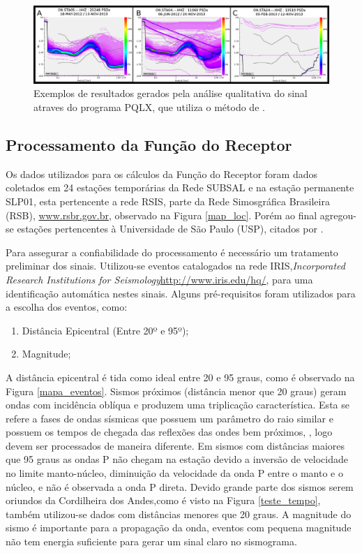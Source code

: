 \begin{figure}[!ht]
\centering
\includegraphics[scale=0.35]{Figs/pqlx_results.png}
\caption{Exemplos de resultados gerados pela análise qualitativa do sinal atraves do programa PQLX, que utiliza o método de \cite{McNamara_Buland_2004}.}
\label{PQLX_results}
\end{figure}

\subsection{Processamento da Função do Receptor}

Os dados utilizados para os cálculos da Função do Receptor foram dados coletados em 24 estações temporárias da Rede SUBSAL e na estação permanente SLP01, esta pertencente a rede RSIS, parte da Rede Simosgráfica Brasileira (RSB), \url{www.rsbr.gov.br}, observado na Figura \ref{map_loc}. Porém ao final agregou-se estações pertencentes à Universidade de São Paulo (USP), citados por \cite{Assumpcao_Brazil_2013}. 

Para assegurar a confiabilidade do processamento é necessário um tratamento preliminar dos sinais. Utilizou-se eventos catalogados na rede IRIS,\textit{Incorporated Research Institutions for Seismology}\url{http://www.iris.edu/hq/}, para uma identificação automática nestes sinais. Alguns pré-requisitos foram utilizados para a escolha dos eventos, como:

\begin{enumerate}
\item Distância Epicentral (Entre 20º e 95º);
\item Magnitude;
\end{enumerate}

A distância epicentral é tida como ideal entre 20 e 95 graus, como é observado na Figura \ref{mapa_eventos}. Sismos próximos (distância menor que 20 graus) geram ondas com incidência oblíqua e produzem uma triplicação característica. Esta se refere a fases de ondas sísmicas que possuem um parâmetro do raio similar e possuem os tempos de chegada das reflexões das ondes bem próximos, \cite{stahler_triplicated_2012}, logo devem ser processados de maneira diferente. Em sismos com distâncias maiores que 95 graus as ondas P não chegam na estação devido a inversão de velocidade no limite manto-núcleo, diminuição da velocidade da onda P entre o manto e o núcleo, e não é observada a onda P direta. Devido grande parte dos sismos serem oriundos da Cordilheira dos Andes,como é visto na Figura \ref{teste_tempo}, também utilizou-se dados com distâncias menores que 20 graus. A magnitude do sismo é importante para a propagação da onda, eventos com pequena magnitude não tem energia suficiente para gerar um sinal claro no sismograma.

